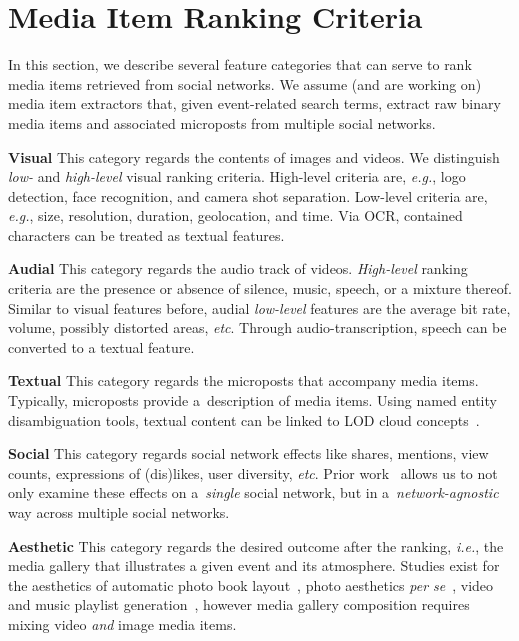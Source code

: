 \section{Media Item Ranking Criteria}
In this section, we describe several feature categories that can serve to rank
media items retrieved from social networks. 
We assume (and are working on) media item extractors that,
given event-related search terms,
extract raw binary media items and associated microposts
from multiple social networks.

\noindent \textbf{Visual}
This category regards the contents of images and videos.
We distinguish \emph{low-} and \emph{high-level} visual ranking criteria.
High-level criteria are, \emph{e.g.}, logo detection,
face recognition, and camera shot separation.
Low-level criteria are, \emph{e.g.}, size, resolution,
duration, geolocation, and time.
Via OCR, contained characters can be treated as textual features.

\noindent \textbf{Audial}
This category regards the audio track of videos.
\emph{High-level} ranking criteria are the presence or absence
of silence, music, speech, or a mixture thereof.
Similar to visual features before,
audial \emph{low-level} features are the average bit rate,
volume, possibly distorted areas, \emph{etc}.
Through audio-transcription, speech can be converted to a textual feature.

\noindent \textbf{Textual}
This category regards the microposts that accompany media items.
Typically, microposts provide a~description of media items.
Using named entity disambiguation tools,
textual content can be linked to LOD cloud concepts~\cite{Facebook2011}.

\noindent \textbf{Social}
This category regards social network effects like shares, mentions,
view counts, expressions of (dis)likes, user diversity, \emph{etc}.
Prior work~\cite{Khrouf2012} allows us to not only examine these effects
on a~\emph{single} social network,
but in a~\emph{network-agnostic} way across multiple social networks.

\noindent \textbf{Aesthetic}
This category regards the desired outcome after the ranking, \emph{i.e.},
the media gallery that illustrates a given event and its atmosphere.
Studies exist for the aesthetics of
automatic photo book layout~\cite{Photo2011},
photo aesthetics \emph{per se}~\cite{Photo2012},
video and music playlist generation~\cite{YouTube2010,Playlist2006},
however media gallery composition requires mixing video
\emph{and} image media items.

